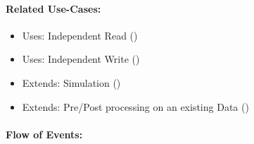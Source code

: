 \paragraph{Related Use-Cases:}
\begin{itemize}
	\item Uses: Independent Read ()
	\item Uses: Independent Write ()
	\item Extends: Simulation ()
	\item Extends: Pre/Post processing on an existing Data ()
\end{itemize}


\paragraph{Flow of Events:}
